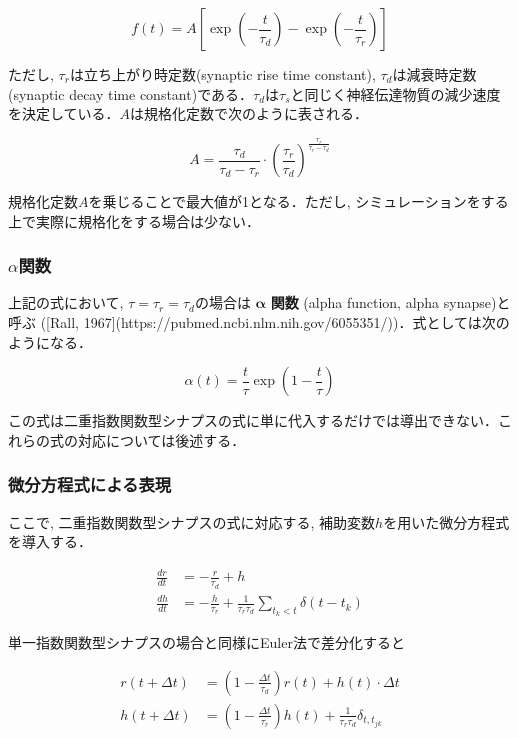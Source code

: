 \begin{equation}
f(t)=A\left[\exp\left(-\frac{t}{\tau_d}\right)-\exp\left(-\frac{t}{\tau_r}\right)\right]    
\end{equation}


ただし, ${\tau_r}$は立ち上がり時定数(synaptic rise time constant), ${\tau_d}$は減衰時定数(synaptic decay time constant)である．$\tau_{d}$は$\tau_{s}$と同じく神経伝達物質の減少速度を決定している．$A$は規格化定数で次のように表される．


\begin{equation}
A=\frac{\tau_d}{\tau_d-\tau_r}\cdot \left(\frac{\tau_r}{\tau_d}\right)^\frac{\tau_r}{\tau_r-\tau_d}    
\end{equation}


規格化定数$A$を乗じることで最大値が1となる．ただし, シミュレーションをする上で実際に規格化をする場合は少ない．

\subsubsection{$\alpha$関数}
上記の式において, $\tau=\tau_{r}=\tau_{d}$の場合は $\boldsymbol{\alpha}$ \textbf{関数} (alpha function, alpha synapse)と呼ぶ ([Rall, 1967](https://pubmed.ncbi.nlm.nih.gov/6055351/))．式としては次のようになる．


\begin{equation}
\alpha(t)=\frac{t}{\tau}\exp\left(1-\frac{t}{\tau}\right)    
\end{equation}


この式は二重指数関数型シナプスの式に単に代入するだけでは導出できない．これらの式の対応については後述する．

\subsubsection{微分方程式による表現}
ここで, 二重指数関数型シナプスの式に対応する, 補助変数$h$を用いた微分方程式を導入する． 


\begin{align} 
\frac{dr}{dt}&=-\frac{r}{\tau_{d}}+h\\
\frac{dh}{dt}&=-\frac{h}{\tau_{r}}+\frac{1}{\tau_{r} \tau_{d}} \sum_{t_{k}< t} \delta\left(t-t_{k}\right) 
\end{align} 


単一指数関数型シナプスの場合と同様にEuler法で差分化すると 


\begin{align} 
r(t+\Delta t)&=\left(1-\frac{\Delta t}{\tau_{d}}\right)r(t)+h(t)\cdot \Delta t\\ 
h(t+\Delta t)&=\left(1-\frac{\Delta t}{\tau_{r}}\right)h(t)+\frac{1}{\tau_{r}\tau_{d}} \delta_{t,t_{j k}}
\end{align}


